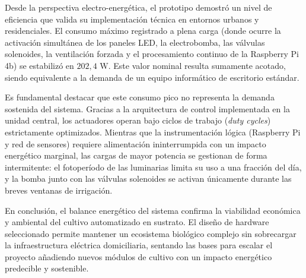 Desde la perspectiva electro-energética, el prototipo demostró un nivel de eficiencia que valida su implementación técnica en entornos urbanos y residenciales. El consumo máximo registrado a plena carga (donde ocurre la activación simultánea de los paneles LED, la electrobomba, las válvulas solenoides, la ventilación forzada y el procesamiento continuo de la Raspberry Pi 4b) se estabilizó en $202{,}4\text{ W}$. Este valor nominal resulta sumamente acotado, siendo equivalente a la demanda de un equipo informático de escritorio estándar.

Es fundamental destacar que este consumo pico no representa la demanda sostenida del sistema. Gracias a la arquitectura de control implementada en la unidad central, los actuadores operan bajo ciclos de trabajo (\textit{duty cycles}) estrictamente optimizados. Mientras que la instrumentación lógica (Raspberry Pi y red de sensores) requiere alimentación ininterrumpida con un impacto energético marginal, las cargas de mayor potencia se gestionan de forma intermitente: el fotoperíodo de las luminarias limita su uso a una fracción del día, y la bomba junto con las válvulas solenoides se activan únicamente durante las breves ventanas de irrigación.

En conclusión, el balance energético del sistema confirma la viabilidad económica y ambiental del cultivo automatizado en sustrato. El diseño de hardware seleccionado permite mantener un ecosistema biológico complejo sin sobrecargar la infraestructura eléctrica domiciliaria, sentando las bases para escalar el proyecto añadiendo nuevos módulos de cultivo con un impacto energético predecible y sostenible.